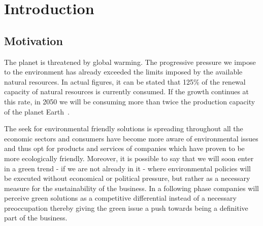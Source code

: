 


\chapter{Introduction} \label{chap1:introduction}



\section{Motivation} \label{sec1:motivation}

    The planet is threatened by global warming. The progressive pressure we impose to the environment has already exceeded the limits imposed by the available natural resources. In actual figures, it can be stated that 125\% of the renewal capacity of natural resources is currently consumed. If the growth continues at this rate, in 2050 we will be consuming more than twice the production capacity of the planet Earth~\cite{Townsend:2002:2050}. 
    
    The seek for environmental friendly solutions is spreading throughout all the economic sectors and consumers have become more aware of environmental issues and thus opt for products and services of companies which have proven to be more ecologically friendly. Moreover, it is possible to say that we will soon enter in a green trend - if we are not already in it - where environmental policies will be executed without economical or political pressure, but rather as a necessary measure for the sustainability of the business. In a following phase companies will perceive green solutions as a competitive differential instead of a necessary preoccupation thereby giving the green issue a push towards being a definitive part of the business.
        
